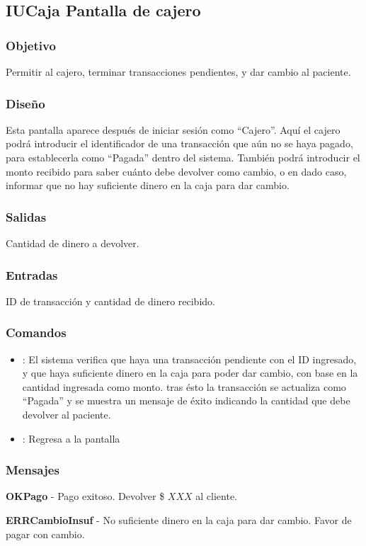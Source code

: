 \subsection{IUCaja Pantalla de cajero}

\subsubsection{Objetivo}
	Permitir al cajero, terminar transacciones pendientes, y dar cambio al paciente.

\subsubsection{Diseño}
	Esta pantalla aparece despu\'es de iniciar sesi\'on como "`Cajero"'. Aqu\'i el cajero podr\'a introducir el identificador de una transacci\'on que a\'un no se haya pagado, para establecerla como "`Pagada"' dentro del sistema. Tambi\'en podr\'a introducir el monto recibido para saber cu\'anto debe devolver como cambio, o en dado caso, informar que no hay suficiente dinero en la caja para dar cambio.


\subsubsection{Salidas}

	Cantidad de dinero a devolver.

\subsubsection{Entradas}
ID de transacci\'on y cantidad de dinero recibido.

\subsubsection{Comandos}
\begin{itemize}
		\item {}: El sistema verifica que haya una transacci\'on pendiente con el ID ingresado, y que haya suficiente dinero en la caja para poder dar cambio, con base en la cantidad ingresada como monto. tras \'esto la transacci\'on se actualiza como "`Pagada"' y se muestra un mensaje de \'exito indicando la cantidad que debe devolver al paciente.
		\item {}: Regresa a la pantalla \label{CU1_1Login}
\end{itemize}

\subsubsection{Mensajes}
	\begin{Citemize}
		\item {\bf OKPago} - Pago exitoso. Devolver \$ $XXX$ al cliente.
		\item {\bf ERRCambioInsuf} - No suficiente dinero en la caja para dar cambio. Favor de pagar con cambio.
	\end{Citemize}